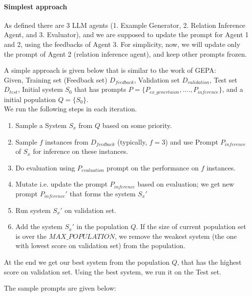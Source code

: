 \documentclass[12pt]{article}
\begin{document}
\paragraph{Simplest approach}

As defined there are 3 LLM agents (1. Example Generator, 2. Relation Inference Agent, and 3. Evaluator), and we are supposed to update the prompt for Agent 1 and 2, using the feedbacks of Agent 3.
For simplicity, now, we will update only the prompt of Agent 2 (relation inference agent), and keep other prompts frozen.

A simple approach is given below that is similar to the work of GEPA: \\
Given, Training set (Feedback set) $D_{feedback}$, Validation set $D_{validation}$, Test set $D_{test}$, Initial system $S_0$ that has prompts $P = \{P_{ex\_genertaion}, ...., P_{inference}\}$, and a initial population $Q = \{S_0\}$. \\
We run the following steps in each iteration.
\begin{enumerate}
  \item Sample a System $S_x$ from $Q$ based on some priority.
  \item Sample $f$ instances from $D_{feedback}$ (typically, $f = 3$) and use Prompt $P_{inference}$ of $S_x$ for inference on these instances.
  \item Do evaluation using $P_{evaluation}$ prompt on the performance on $f$ instances.
  \item Mutate i.e. update the prompt $P_{inference}$ based on evaluation; we get new prompt $P_{inference}'$ that forms the system $S_x'$
  \item Run system $S_x'$ on validation set.
  \item Add the system $S_x'$ in the population $Q$. If the size of current population set is over the $MAX\_POPULATION$, we remove the weakest system (the one with lowest score on validation set) from the population. 
\end{enumerate}
At the end we get our best system from the population $Q$, that has the highest score on validation set.
Using the best system, we run it on the Test set.

The sample prompts are given below:
\pagebreak
\end{document}
